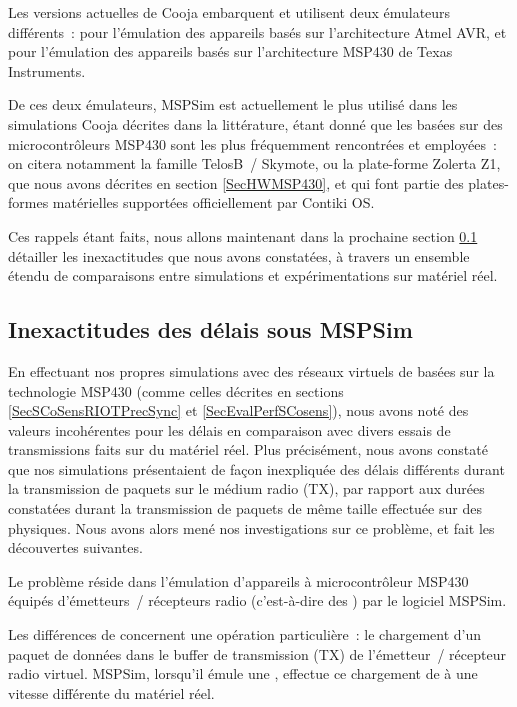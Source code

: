 Les versions actuelles de Cooja embarquent et utilisent deux émulateurs
différents~:  \cite{Avrora} pour l'émulation des appareils basés
sur l'architecture Atmel AVR, et  \cite{MSPSim} pour l'émulation
des appareils basés sur l'architecture MSP430 de Texas Instruments.

De ces deux émulateurs, MSPSim est actuellement le plus utilisé dans
les simulations Cooja décrites dans la littérature, étant donné que
les  basées sur des microcontrôleurs MSP430 sont les plus
fréquemment rencontrées et employées~: on citera notamment la famille
TelosB~/ Skymote, ou la plate-forme Zolerta Z1, que nous avons
décrites en section \vref{SecHWMSP430}, et qui font partie des
plates-formes matérielles supportées officiellement par Contiki OS.

Ces rappels étant faits, nous allons maintenant dans la prochaine section
\ref{SubsecInexDelaisMSPSim} détailler les inexactitudes que nous avons
constatées, à travers un ensemble étendu de comparaisons entre simulations
et expérimentations sur matériel réel.


\subsection{Inexactitudes des délais sous MSPSim}
\label{SubsecInexDelaisMSPSim}

En effectuant nos propres simulations avec des réseaux virtuels de
 basées sur la technologie MSP430 (comme celles décrites en
sections \vref{SecSCoSensRIOTPrecSync} et \vref{SecEvalPerfSCosens}),
nous avons noté des valeurs incohérentes pour les délais en comparaison
avec divers essais de transmissions faits sur du matériel réel. Plus
précisément, nous avons constaté que nos simulations présentaient de façon
inexpliquée des délais différents durant la transmission de paquets sur
le médium radio (TX), par rapport aux durées constatées durant la
transmission de paquets de même taille effectuée sur des 
physiques. Nous avons alors mené nos investigations sur ce problème,
et fait les découvertes suivantes.

Le problème réside dans l'émulation d'appareils à microcontrôleur MSP430
équipés d'émetteurs~/ récepteurs radio (c'est-à-dire des )
par le logiciel MSPSim.

Les différences de  concernent une opération particulière~:
le chargement d'un paquet de données dans le buffer de transmission (TX)
de l'émetteur~/ récepteur radio virtuel. MSPSim, lorsqu'il émule une
, effectue ce chargement de  à une vitesse
différente du matériel réel.


